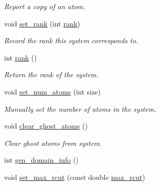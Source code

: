 \begin{DoxyCompactItemize}
\begin{DoxyCompactList}\small\item\em Report a copy of an atom. \end{DoxyCompactList}\item 
\hypertarget{classSystem_a57997afb5d0cce89ab51e95d06d83972}{void \hyperlink{classSystem_a57997afb5d0cce89ab51e95d06d83972}{set\-\_\-rank} (int \hyperlink{classSystem_ac09723cae5531f826fb85b05b6ad5f2b}{rank})}\label{classSystem_a57997afb5d0cce89ab51e95d06d83972}

\begin{DoxyCompactList}\small\item\em Record the rank this system corresponds to. \end{DoxyCompactList}\item 
\hypertarget{classSystem_ac09723cae5531f826fb85b05b6ad5f2b}{int \hyperlink{classSystem_ac09723cae5531f826fb85b05b6ad5f2b}{rank} ()}\label{classSystem_ac09723cae5531f826fb85b05b6ad5f2b}

\begin{DoxyCompactList}\small\item\em Return the rank of the system. \end{DoxyCompactList}\item 
\hypertarget{classSystem_ac33ec3abf09c300d1c080d36b206e966}{void \hyperlink{classSystem_ac33ec3abf09c300d1c080d36b206e966}{set\-\_\-num\-\_\-atoms} (int size)}\label{classSystem_ac33ec3abf09c300d1c080d36b206e966}

\begin{DoxyCompactList}\small\item\em Manually set the number of atoms in the system. \end{DoxyCompactList}\item 
void \hyperlink{classSystem_a3c598e8d2ca9bae20c78ef21759f3a12}{clear\-\_\-ghost\-\_\-atoms} ()
\begin{DoxyCompactList}\small\item\em Clear ghost atoms from system. \end{DoxyCompactList}\item 
int \hyperlink{classSystem_ab7c96922f7c7da037044657f7edfd3e5}{gen\-\_\-domain\-\_\-info} ()
\item 
\hypertarget{classSystem_a8f661d16570bd451fa4b017c0eebdbb8}{void \hyperlink{classSystem_a8f661d16570bd451fa4b017c0eebdbb8}{set\-\_\-max\-\_\-rcut} (const double \hyperlink{classSystem_aebf96e8a2302ab4dd48cee8614f546c1}{max\-\_\-rcut})}\label{classSystem_a8f661d16570bd451fa4b017c0eebdbb8}


\end{DoxyCompactItemize}
